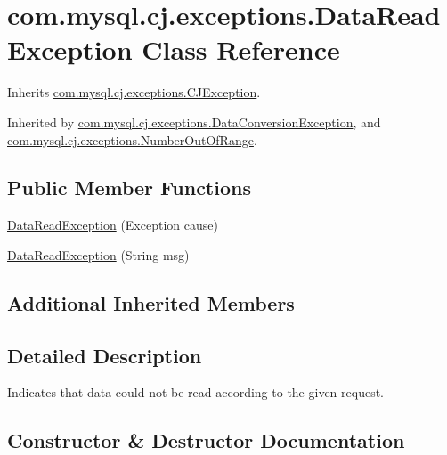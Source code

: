 \hypertarget{classcom_1_1mysql_1_1cj_1_1exceptions_1_1_data_read_exception}{}\section{com.\+mysql.\+cj.\+exceptions.\+Data\+Read\+Exception Class Reference}
\label{classcom_1_1mysql_1_1cj_1_1exceptions_1_1_data_read_exception}


Inherits \mbox{\hyperlink{classcom_1_1mysql_1_1cj_1_1exceptions_1_1_c_j_exception}{com.\+mysql.\+cj.\+exceptions.\+C\+J\+Exception}}.



Inherited by \mbox{\hyperlink{classcom_1_1mysql_1_1cj_1_1exceptions_1_1_data_conversion_exception}{com.\+mysql.\+cj.\+exceptions.\+Data\+Conversion\+Exception}}, and \mbox{\hyperlink{classcom_1_1mysql_1_1cj_1_1exceptions_1_1_number_out_of_range}{com.\+mysql.\+cj.\+exceptions.\+Number\+Out\+Of\+Range}}.

\subsection*{Public Member Functions}
\begin{DoxyCompactItemize}
\item 
\mbox{\hyperlink{classcom_1_1mysql_1_1cj_1_1exceptions_1_1_data_read_exception_ade63ac9f329e88a0329c846d0e921d65}{Data\+Read\+Exception}} (Exception cause)
\item 
\mbox{\hyperlink{classcom_1_1mysql_1_1cj_1_1exceptions_1_1_data_read_exception_a34be28306c933033e6dd220c1547db1a}{Data\+Read\+Exception}} (String msg)
\end{DoxyCompactItemize}
\subsection*{Additional Inherited Members}


\subsection{Detailed Description}
Indicates that data could not be read according to the given request. 

\subsection{Constructor \& Destructor Documentation}
\mbox{\label{classcom_1_1mysql_1_1cj_1_1exceptions_1_1_data_read_exception_ade63ac9f329e88a0329c846d0e921d65}} 
